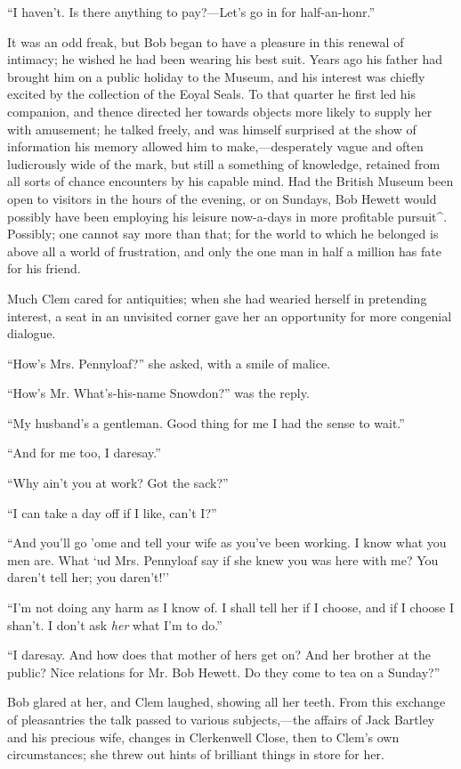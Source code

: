 {}``I haven't. Is there anything to pay?---Let's go in for
half-an-honr.''

It was an odd freak, but Bob began to have a pleasure in this renewal of
intimacy; he wished he had been wearing his best suit. Years ago his
father had brought him on a public holiday to the Museum, and his
interest was chiefly excited by the collection of the Eoyal Seals. To
that quarter he first led his companion, and thence directed her towards
objects more likely to supply her with amusement; he talked freely, and
was himself surprised at the show of information his memory allowed him
to make,---desperately vague and often ludicrously wide of the mark, but
still a something of knowledge, retained from all sorts of chance
encounters by his capable mind. Had the British Museum been open to
visitors in the hours of the evening, or on Sundays, Bob Hewett would
possibly have been employing his leisure now-a-days in more profitable
pursuit\^{}. Possibly; one cannot say more than that; for the world to
which he belonged is above all {}a world of frustration, and only the
one man in half a million has fate for his friend.

Much Clem cared for antiquities; when she had wearied herself in
pretending interest, a seat in an unvisited corner gave her an
opportunity for more congenial dialogue.

``How's Mrs. Pennyloaf?'' she asked, with a smile of malice.

``How's Mr. What's-his-name Snowdon?'' was the reply.

``My husband's a gentleman. Good thing for me I had the sense to wait.''

``And for me too, I daresay.''

``Why ain't you at work? Got the sack?''

``I can take a day off if I like, can't I?''

``And you'll go 'ome and tell your wife as you've been working. I know
what you men are. What `ud Mrs. Pennyloaf say if she knew you was here
with me? You daren't tell her; you daren't!''

``I'm not doing any harm as I know of. I shall tell her if I choose, and
if I choose I shan't. I don't ask \emph{her} what I'm to do.''

``I daresay. And how does that mother of {}hers get on? And her brother
at the public? Nice relations for Mr. Bob Hewett. Do they come to tea on
a Sunday?''

Bob glared at her, and Clem laughed, showing all her teeth. From this
exchange of pleasantries the talk passed to various subjects,---the
affairs of Jack Bartley and his precious wife, changes in Clerkenwell
Close, then to Clem's own circumstances; she threw out hints of
brilliant things in store for her.

